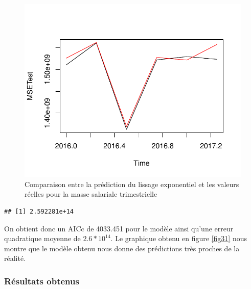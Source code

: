 \documentclass[11pt,]{article}
\begin{document}
\begin{figure}

{\centering \includegraphics{Rapport_final_files/figure-latex/unnamed-chunk-51-1} 

}

\caption{\label{fig31} Comparaison entre la prédiction du lissage exponentiel et les valeurs réelles pour la masse salariale trimestrielle}\label{fig:unnamed-chunk-51}
\end{figure}

\begin{verbatim}
## [1] 2.592281e+14
\end{verbatim}

On obtient donc un AICc de 4033.451 pour le modèle ainsi qu'une erreur
quadratique moyenne de \(2.6*10^{14}\). Le graphique obtenu en figure
\ref{fig31} nous montre que le modèle obtenu nous donne des prédictions
très proches de la réalité.

\subsubsection{Résultats obtenus}\label{resultats-obtenus}
\end{document}
